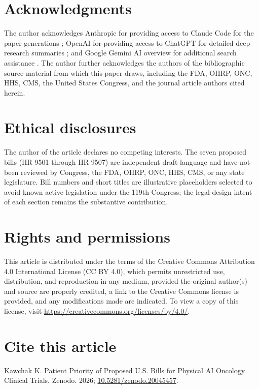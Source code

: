 
{}
\section*{Acknowledgments}
\label{sec:acknowledgments}

The author acknowledges Anthropic for providing access to Claude Code
for the paper generations \cite{claude_code, claude_opus_47,
claude_sonnet_46}; OpenAI for providing access to ChatGPT for detailed
deep research summaries \cite{chatgpt_thinking}; and Google Gemini AI
overview for additional search assistance
\cite{google_gemini_overview}. The author further acknowledges the
authors of the bibliographic source material from which this paper
draws, including the FDA, OHRP, ONC, HHS, CMS, the United States
Congress, and the journal article authors cited herein.

{}
\section*{Ethical disclosures}
\label{sec:ethics}

The author of the article declares no competing interests. The seven
proposed bills (HR 9501 through HR 9507) are independent draft
language and have not been reviewed by Congress, the FDA, OHRP, ONC,
HHS, CMS, or any state legislature. Bill numbers and short titles are
illustrative placeholders selected to avoid known active legislation
under the 119th Congress; the legal-design intent of each section
remains the substantive contribution.

{}
\section*{Rights and permissions}
\label{sec:rights}

This article is distributed under the terms of the Creative Commons
Attribution 4.0 International License (CC BY 4.0), which permits
unrestricted use, distribution, and reproduction in any medium,
provided the original author(s) and source are properly credited, a
link to the Creative Commons license is provided, and any modifications
made are indicated. To view a copy of this license, visit
\url{https://creativecommons.org/licenses/by/4.0/}.

{}
\section*{Cite this article}
\label{sec:cite}

Kawchak K. Patient Priority of Proposed U.S. Bills for Physical AI Oncology Clinical Trials. Zenodo. 2026;
\href{https://doi.org/10.5281/zenodo.20045457}{10.5281/zenodo.20045457}.
